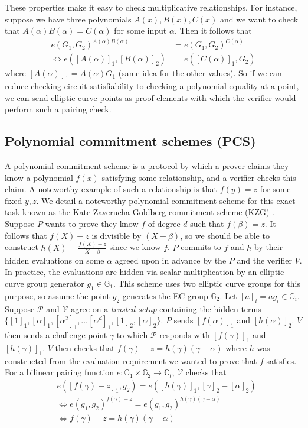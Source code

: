 These properties make it easy to check multiplicative relationships. For instance, suppose we have three polynomials $A(x), B(x), C(x)$ and we want to check that $A(\alpha)B(\alpha) = C(\alpha)$ for some input $\alpha$. Then it follows that 
\begin{align*}
e(G_1, G_2)^{A(\alpha)B(\alpha)} &= e(G_1, G_2)^{C(\alpha)} \\
\Leftrightarrow e([A(\alpha)]_1, [B(\alpha)]_2) &= e([C(\alpha)]_1, G_2)
\end{align*}
where $[A(\alpha)]_1 = A(\alpha)G_1$ (same idea for the other values). So if we can reduce checking circuit satisfiability to checking a polynomial equality at a point, we can send elliptic curve points as proof elements with which the verifier would perform such a pairing check. 

\subsection{Polynomial commitment schemes (PCS)}
\noindent A polynomial commitment scheme is a protocol by which a prover claims they know a polynomial $f(x)$ satisfying some relationship, and a verifier checks this claim. A noteworthy example of such a relationship is that $f(y) = z$ for some fixed $y, z$. We detail a noteworthy polynomial commitment scheme for this exact task known as the Kate-Zaverucha-Goldberg commitment scheme (KZG) \cite{kzg}. Suppose $P$ wants to prove they know $f$ of degree $d$ such that $f(\beta) = z$. It follows that $f(X) - z$ is divisible by $(X - \beta)$, so we should be able to construct $h(X) = \frac{f(X) - z}{X - \beta}$ since we know $f$. $P$ commits to $f$ and $h$ by their hidden evaluations on some $\alpha$ agreed upon in advance by the $P$ and the verifier $V$. In practice, the evaluations are hidden via scalar multiplication by an elliptic curve group generator $g_1 \in \mathbb{G}_1$. This scheme uses two elliptic curve groups for this purpose, so assume the point $g_2$ generates the EC group $\mathbb{G}_2$. Let $[a]_i = ag_i \in \mathbb{G}_i$. Suppose $\mathcal{P}$ and $\mathcal{V}$ agree on a \textit{trusted setup} containing the hidden terms $\{[1]_1, [\alpha]_1, [\alpha^2]_1, \dots [\alpha^{d}]_1, [1]_2, [\alpha]_2\}$. $P$ sends $[f(\alpha)]_1$ and $[h(\alpha)]_2$. $V$ then sends a challenge point $\gamma$ to which $\mathcal{P}$ responds with $[f(\gamma)]_1$ and $[h(\gamma)]_1$. $V$ then checks that $f(\gamma) - z = h(\gamma)(\gamma - \alpha)$ where $h$ was constructed from the evaluation requirement we wanted to prove that $f$ satisfies. For a bilinear pairing function $e : \mathbb{G}_1 \times \mathbb{G}_2 \to \mathbb{G}_t$, $\mathcal{V}$ checks that 
\begin{align}
&e([f(\gamma) - z]_1, g_2) = e([h(\gamma)]_1, [\gamma]_2 - [\alpha]_2) \\
&\Leftrightarrow e(g_1, g_2)^{f(\gamma) - z} = e(g_1, g_2)^{h(\gamma)(\gamma - \alpha)} \\
&\Leftrightarrow  f(\gamma) - z = h(\gamma)(\gamma - \alpha)
\end{align}

